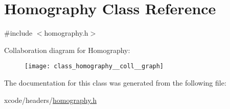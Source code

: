 \hypertarget{class_homography}{\section{Homography Class Reference}
\label{class_homography}
}


{\ttfamily \#include $<$homography.\-h$>$}



Collaboration diagram for Homography\-:\nopagebreak
\begin{figure}[H]
\begin{center}
\leavevmode
\texttt{[image: class\_homography\_\_coll\_\_graph]}
\end{center}
\end{figure}


The documentation for this class was generated from the following file\-:\begin{DoxyCompactItemize}
\item 
xcode/headers/\hyperlink{homography_8h}{homography.\-h}\end{DoxyCompactItemize}
